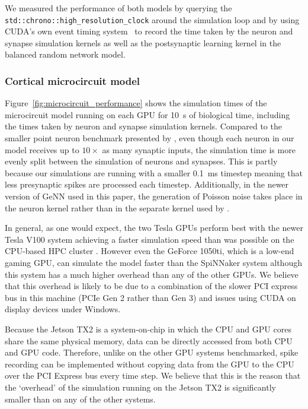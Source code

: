 \documentclass[utf8]{frontiersSCNS} %
\begin{document}
We measured the performance of both models by querying the \lstinline{std::chrono::high_resolution_clock} around the simulation loop and by using CUDA's own event timing system~\citep[Section~3.2.5.6.2]{NVIDIACorporation2018} to record the time taken by the neuron and synapse simulation kernels as well as the postsynaptic learning kernel in the balanced random network model.

\subsubsection{Cortical microcircuit model}
Figure~\ref{fig:microcircuit_performance} shows the simulation times of the microcircuit model running on each GPU for \SI{10}{\second} of biological time, including the times taken by neuron and synapse simulation kernels.
Compared to the smaller point neuron benchmark presented by \citet{Yavuz2016}, even though each neuron in our model receives up to $10\times$ as many synaptic inputs, the simulation time is more evenly split between the simulation of neurons and synapses.
This is partly because our simulations are running with a smaller \SI{0.1}{\milli\second} timestep meaning that less presynaptic spikes are processed each timestep.
Additionally, in the newer version of GeNN used in this paper, the generation of Poisson noise takes place in the neuron kernel rather than in the separate kernel used by \citeauthor{Yavuz2016}.

In general, as one would expect, the two Tesla GPUs perform best with the newer Tesla V100 system achieving a faster simulation speed than was possible on the CPU-based HPC cluster \citep{VanAlbada2018}.
However even the GeForce 1050ti, which is a low-end gaming GPU, can simulate the model faster than the SpiNNaker system although this system has a much higher overhead than any of the other GPUs.
We believe that this overhead is likely to be due to a combination of the slower PCI express bus in this machine (PCIe Gen 2 rather than Gen 3) and issues using CUDA on display devices under Windows.

Because the Jetson TX2 is a system-on-chip in which the CPU and GPU cores share the same physical memory, data can be directly accessed from both CPU and GPU code.
Therefore, unlike on the other GPU systems benchmarked, spike recording can be implemented without copying data from the GPU to the CPU over the PCI Express bus every time step.
We believe that this is the reason that the `overhead' of the simulation running on the Jetson TX2 is significantly smaller than on any of the other systems.
\end{document}

